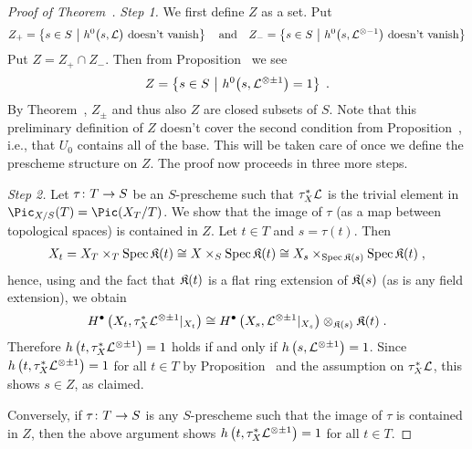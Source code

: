 \documentclass[a4paper,parskip=half,numbers=enddot, DIV=12]{scrreprt}
\begin{document}
\begin{proof}[Proof of Theorem~]
	\emph{Step 1.} We first define $Z$ as a set. Put
	\begin{align*}
		Z_+=\left\{s\in S\ \middle|\  h^0\big(s,\mathcal{L}\big)\text{ doesn't vanish}\right\}\quad\text{and}\quad Z_-=\left\{s\in S\ \middle|\  h^0\big(s,\mathcal{L}^{\otimes -1}\big)\text{ doesn't vanish}\right\}
	\end{align*}
	Put $Z=Z_+\cap Z_-$. Then from 
	Proposition~ we see 
	\begin{align*}
		Z=\left\{s\in S\ \middle|\  h^0\big(s,\mathcal{L}^{\otimes \pm 1}\big)=1\right\}\;.
	\end{align*}
	By Theorem~, $Z_\pm$ and thus also $Z$ are closed subsets of $S$. Note that this preliminary definition of $Z$ doesn't cover the second condition from Proposition~, i.e., that $U_0$ contains all of the base. This will be taken care of once we define the prescheme structure on $Z$. The proof now proceeds in three more steps.
	
	 \emph{Step 2.} Let $\tau\colon T\morphism S$ be an $S$-prescheme such that $\tau_X^*\mathcal{L}$ is the trivial element in $\Pic_{X/S}(T)=\Pic(X_T/T)$. We show that the image of $\tau$ (as a map between topological spaces) is contained in $Z$.  Let $t\in T$ and $s=\tau(t)$. Then
	\begin{align*}
		X_t=X_T\times_T\operatorname{Spec}\mathfrak{K}(t)\cong X\times_S\operatorname{Spec}\mathfrak{K}(t)\cong X_s\times_{\operatorname{Spec}\mathfrak{K}(s)}\operatorname{Spec}\mathfrak{K}(t)\;,
	\end{align*}
	hence, using  and the fact that $\mathfrak{K}(t)$ is a flat ring extension of $\mathfrak{K}(s)$ (as is any field extension), we obtain
	\begin{align*}
		H^\bullet\left(X_t,\tau_X^*\mathcal{L}^{\otimes \pm 1}|_{X_t}\right)\cong H^\bullet\left(X_s,\mathcal{L}^{\otimes \pm 1}|_{X_s}\right)\otimes_{\mathfrak{K}(s)}\mathfrak{K}(t)\;.
	\end{align*}
	 Therefore $h\left(t,\tau_X^*\mathcal{L}^{\otimes \pm 1}\right)=1$ holds if and only if $h\left(s,\mathcal{L}^{\otimes \pm 1}\right)=1$. Since $h\left(t,\tau_X^*\mathcal{L}^{\otimes \pm 1}\right)=1$ for all $t\in T$ by Proposition~ and the assumption on $\tau_X^*\mathcal{L}$, this shows $s\in Z$, as claimed.
	
	Conversely, if $\tau\colon T\morphism S$ is any $S$-prescheme such that the image of  $\tau$ is contained in $Z$, then the above argument shows $h\left(t,\tau_X^*\mathcal{L}^{\otimes \pm 1}\right)=1$ for all $t\in T$.
	

\end{proof}
\end{document}
